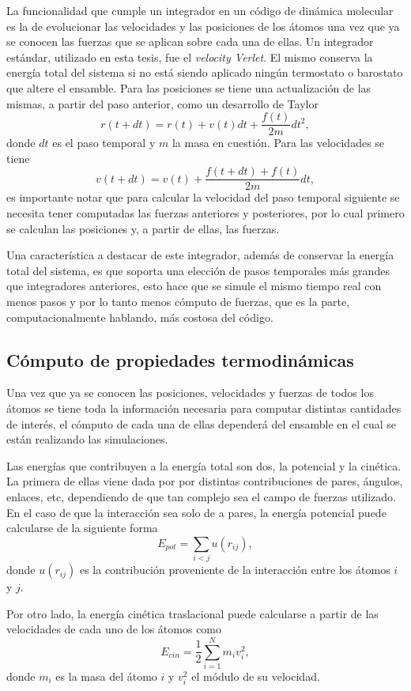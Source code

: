La funcionalidad que cumple un integrador en un código de dinámica molecular es
la de evolucionar las velocidades y las posiciones de los átomos una vez que 
ya se conocen las fuerzas que se aplican sobre cada una de ellas. Un integrador
estándar, utilizado en esta tesis, fue el \textit{velocity Verlet}. El mismo 
conserva la energía total del sistema si no está siendo aplicado ningún termostato
o barostato que altere el ensamble. Para las posiciones se tiene una
actualización de las mismas, a partir del paso anterior, como un desarrollo de
Taylor
$$
r(t+dt) = r(t) + v(t) dt + \frac{f(t)}{2m} dt^2,
$$
donde $dt$ es el paso temporal y $m$ la masa en cuestión. Para las velocidades se
tiene
$$
v(t+dt) = v(t) + \frac{f(t+dt)+f(t)}{2m} dt,
$$
es importante notar que para calcular la velocidad del paso temporal siguiente se
necesita tener computadas las fuerzas anteriores y posteriores, por lo cual
primero se calculan las posiciones y, a partir de ellas, las fuerzas.

Una característica a destacar de este integrador, además de conservar la energía
total del sistema, es que soporta una elección de pasos temporales más grandes
que integradores anteriores, esto hace que se simule el mismo tiempo real con 
menos pasos y por lo tanto menos cómputo de fuerzas, que es la parte, 
computacionalmente hablando, más costosa del código.

\subsection{Cómputo de propiedades termodinámicas}

Una vez que ya se conocen las posiciones, velocidades y fuerzas de todos los 
átomos se tiene toda la información necesaria para computar distintas
cantidades de interés, el cómputo de cada una de ellas dependerá del ensamble en
el cual se están realizando las simulaciones.

Las energías que contribuyen a la energía total son dos, la potencial y la
cinética. La primera de ellas viene dada por por distintas contribuciones de
pares, ángulos, enlaces, etc, dependiendo de que tan complejo sea el campo de 
fuerzas utilizado. En el caso de que la interacción sea solo de a pares, la
energía potencial puede calcularse de la siguiente forma
$$
E_{pot} = \sum_{i < j} u(r_{ij}),
$$
donde $u(r_{ij})$ es la contribución proveniente de la interacción entre los 
átomos $i$ y $j$.

Por otro lado, la energía cinética traslacional puede calcularse a partir de las
velocidades de cada uno de los átomos como
$$
E_{cin} = \frac{1}{2} \sum_{i=1}^{N} m_i v_i^2, 
$$
donde $m_i$ es la masa del átomo $i$ y $v_i^2$ el módulo de su velocidad. 

